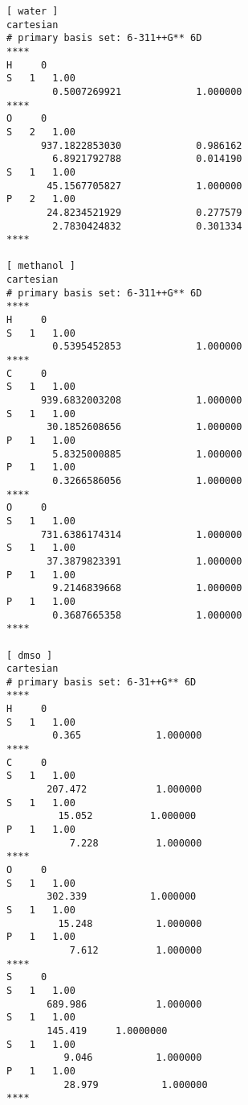 \begin{verbatim}
[ water ]
cartesian
# primary basis set: 6-311++G** 6D
****
H     0
S   1   1.00
        0.5007269921             1.000000
****
O     0
S   2   1.00
      937.1822853030             0.986162 
        6.8921792788             0.014190 
S   1   1.00
       45.1567705827             1.000000
P   2   1.00
       24.8234521929             0.277579 
        2.7830424832             0.301334 
****

[ methanol ]
cartesian
# primary basis set: 6-311++G** 6D
****
H     0
S   1   1.00
        0.5395452853             1.000000
****
C     0
S   1   1.00
      939.6832003208             1.000000
S   1   1.00
       30.1852608656             1.000000
P   1   1.00
        5.8325000885             1.000000
P   1   1.00
        0.3266586056             1.000000
****
O     0
S   1   1.00
      731.6386174314             1.000000
S   1   1.00
       37.3879823391             1.000000
P   1   1.00
        9.2146839668             1.000000
P   1   1.00
        0.3687665358             1.000000
****

[ dmso ]
cartesian
# primary basis set: 6-31++G** 6D
****
H     0
S   1   1.00
        0.365             1.000000
****
C     0
S   1   1.00
       207.472            1.000000
S   1   1.00
         15.052          1.000000
P   1   1.00
           7.228          1.000000
****
O     0
S   1   1.00
       302.339           1.000000
S   1   1.00
         15.248           1.000000
P   1   1.00
           7.612          1.000000
****
S     0
S   1   1.00
       689.986            1.000000
S   1   1.00
       145.419     1.0000000
S   1   1.00
          9.046           1.000000
P   1   1.00
          28.979           1.000000
****
\end{verbatim}






